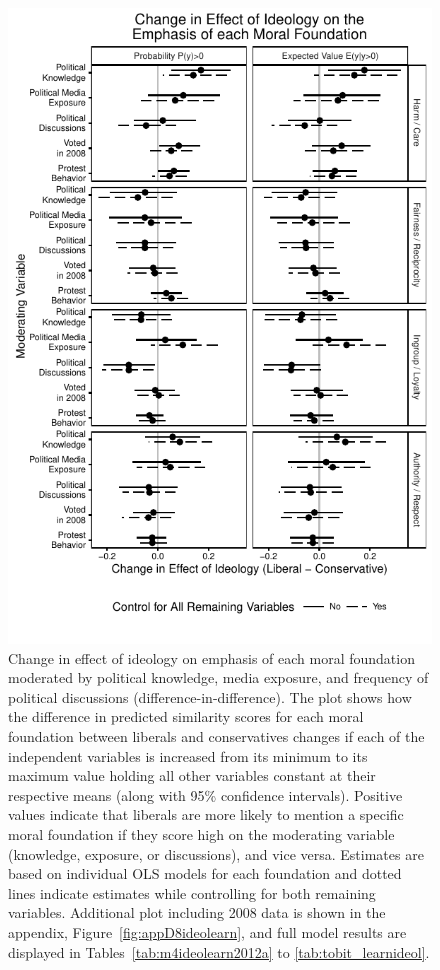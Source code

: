 \documentclass[12pt]{article}
\begin{document}
\begin{figure}[h]\centering
\includegraphics{../calc/fig/tobit_learnideol.pdf}
\caption{Change in effect of ideology on emphasis of each moral foundation moderated by political knowledge, media exposure, and frequency of political discussions (difference-in-difference). The plot shows how the difference in predicted similarity scores for each moral foundation between liberals and conservatives changes if each of the independent variables is increased from its minimum to its maximum value holding all other variables constant at their respective means (along with 95\% confidence intervals). Positive values indicate that liberals are more likely to mention a specific moral foundation if they score high on the moderating variable (knowledge, exposure, or discussions), and vice versa. Estimates are based on individual OLS models for each foundation and dotted lines indicate estimates while controlling for both remaining variables. Additional plot including 2008 data is shown in the appendix, Figure~\ref{fig:appD8ideolearn}, and full model results are displayed in Tables~\ref{tab:m4ideolearn2012a} to \ref{tab:tobit_learnideol}.}\label{fig:tobit_learnideol}
\end{figure}
\end{document}
